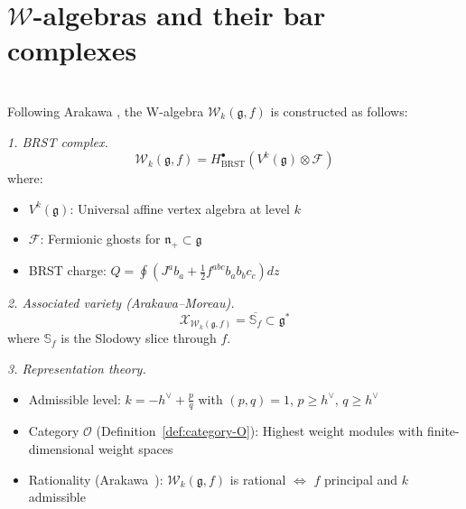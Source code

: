 \section{$\mathcal{W}$-algebras and their bar complexes}

\begin{theorem}\label{thm:w-algebras}
\leavevmode\\
Following Arakawa \cite{arakawa-lectures}, the W-algebra
$\mathcal{W}_k(\mathfrak{g}, f)$ is constructed as follows:

\noindent\emph{1. BRST complex.}
\[\mathcal{W}_k(\mathfrak{g}, f) = H^{\bullet}_{\text{BRST}}(V^k(\mathfrak{g}) \otimes \mathcal{F})\]
where:
\begin{itemize}
\item $V^k(\mathfrak{g})$: Universal affine vertex algebra at level $k$
\item $\mathcal{F}$: Fermionic ghosts for $\mathfrak{n}_+ \subset \mathfrak{g}$
\item BRST charge: $Q = \oint (J^a b_a + \frac{1}{2}f^{abc}b_a b_b c_c) dz$
\end{itemize}

\noindent\emph{2. Associated variety (Arakawa--Moreau).}
\[\mathcal{X}_{\mathcal{W}_k(\mathfrak{g}, f)} = \overline{\mathbb{S}_f} \subset \mathfrak{g}^*\]
where $\mathbb{S}_f$ is the Slodowy slice through $f$.

\noindent\emph{3. Representation theory.}
\begin{itemize}
\item Admissible level: $k = -h^{\vee} + \frac{p}{q}$ with $(p,q) = 1$, $p \geq h^{\vee}$, $q \geq h^{\vee}$
\item Category $\mathcal{O}$ (Definition~\ref{def:category-O}): Highest weight modules with finite-dimensional weight spaces
\item Rationality (Arakawa~\cite{Ara07}): $\mathcal{W}_k(\mathfrak{g}, f)$ is rational $\Leftrightarrow$ $f$ principal and $k$ admissible
\end{itemize}
\end{theorem}

